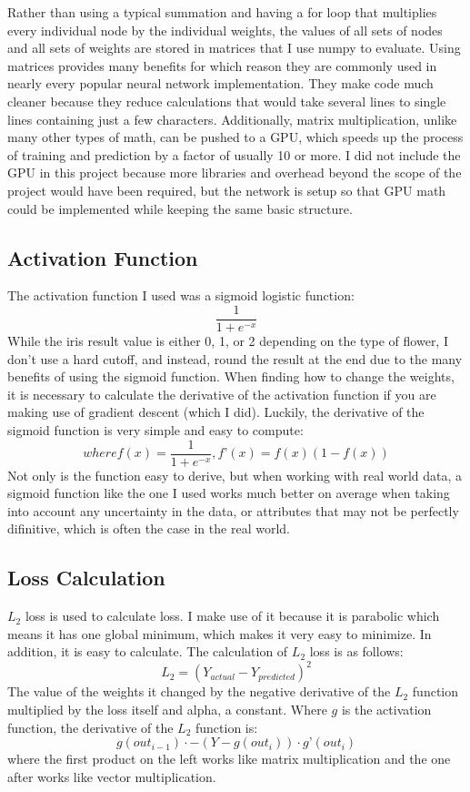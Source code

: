 \documentclass[12pt]{article}
\begin{document}
Rather than using a typical summation and having a for loop that multiplies every individual node by
the individual weights, the values of all sets of nodes and all sets of weights are stored in matrices
that I use numpy to evaluate. Using matrices provides many benefits for which reason they are
commonly used in nearly every popular neural network implementation. They make code much
cleaner because they reduce calculations that would take several lines to single lines containing
just a few characters. Additionally, matrix multiplication, unlike many other types of math, can be
pushed to a GPU, which speeds up the process of training and prediction by a factor of usually 10
or more. I did not include the GPU in this project because more libraries and overhead beyond the
scope of the project would have been required, but the network is setup so that GPU math could
be implemented while keeping the same basic structure.

\subsection{Activation Function}

The activation function I used was a sigmoid logistic function:
$$\dfrac{1}{1+e^{-x}}$$
While the iris result value is either 0, 1, or 2 depending on the type of flower, I don’t use a hard
cutoff, and instead, round the result at the end due to the many benefits of using the sigmoid
function. When finding how to change the weights, it is necessary to calculate the derivative of the
activation function if you are making use of gradient descent (which I did). Luckily, the derivative of
the sigmoid function is very simple and easy to compute:
$$where f(x) = \dfrac{1}{1+e^{-x}}, f’(x) = f(x)(1 - f(x))$$
Not only is the function easy to derive, but when working with real world data, a sigmoid function
like the one I used works much better on average when taking into account any uncertainty in the
data, or attributes that may not be perfectly difinitive, which is often the case in the real world.

\subsection{Loss Calculation}

$L_2$ loss is used to calculate loss. I make use of it because it is parabolic which means it has
one global minimum, which makes it very easy to minimize. In addition, it is easy to calculate. The
calculation of  $L_2$ loss is as follows:
$$L_2 = (Y_{actual} - Y_{predicted})^2$$
The value of the weights it changed by the negative derivative of the $L_2$ function multiplied by
the loss itself and alpha, a constant. Where $g$ is the activation function, the derivative of the $L_2$ function is:
$$g(out_{i-1}) \cdot -(Y - g(out_{i})) \cdot g’(out_{i})$$
where the first product on the left works like matrix multiplication and the one after works like
vector multiplication.
\end{document}

